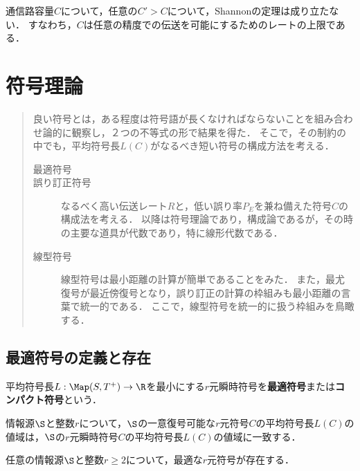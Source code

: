 \documentclass[uplatex,dvipdfmx]{jsreport}
\begin{document}
\begin{corollary}
    通信路容量$C$について，任意の$C'>C$について，Shannonの定理は成り立たない．
    すなわち，$C$は任意の精度での伝送を可能にするためのレートの上限である．
\end{corollary}

\chapter{符号理論}

\begin{quotation}
    良い符号とは，ある程度は符号語が長くなければならないことを組み合わせ論的に観察し，２つの不等式の形で結果を得た．
    そこで，その制約の中でも，平均符号長$L(C)$がなるべき短い符号の構成方法を考える．
    \begin{description}
        \item[最適符号] 
        \item[誤り訂正符号] なるべく高い伝送レート$R$と，低い誤り率$P_E$を兼ね備えた符号$C$の構成法を考える．
        以降は符号理論であり，構成論であるが，その時の主要な道具が代数であり，特に線形代数である．
        \item[線型符号] 線型符号は最小距離の計算が簡単であることをみた．
        また，最尤復号が最近傍復号となり，誤り訂正の計算の枠組みも最小距離の言葉で統一的である．
        ここで，線型符号を統一的に扱う枠組みを鳥瞰する．
    \end{description}
\end{quotation}

\section{最適符号の定義と存在}

\begin{definition}
    平均符号長$L:\Map(S,T^+)\to\R$を最小にする$r$元瞬時符号を\textbf{最適符号}または\textbf{コンパクト符号}という．
\end{definition}

\begin{lemma}
    情報源$\S$と整数$r$について，$\S$の一意復号可能な$r$元符号$C$の平均符号長$L(C)$の値域は，$\S$の$r$元瞬時符号$C$の平均符号長$L(C)$の値域に一致する．
\end{lemma}

\begin{theorem}
    任意の情報源$\S$と整数$r\ge2$について，最適な$r$元符号が存在する．
\end{theorem}
\end{document}
